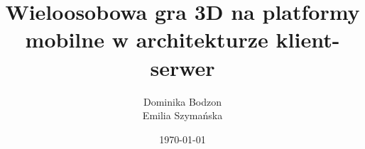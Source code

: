 \documentclass{mini}
\title{Wieloosobowa gra 3D na platformy mobilne w architekturze klient-serwer}
\author{Dominika Bodzon\\Emilia Szyma{\'n}ska}
\date{\today}
\begin{document}
\maketitle




\tableofcontents












\makestatement
\end{document}
